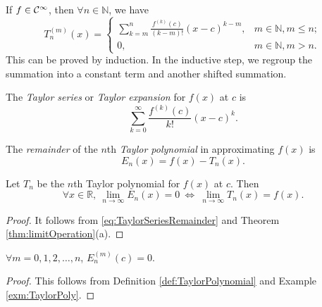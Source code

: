  \begin{exm}
   \label{exm:TaylorPoly}
  If $f\in {\cal C}^{\infty}$, then $\forall n\in\mathbb{N}$,
   we have
  \begin{equation*}
    T_n^{(m)}(x) = \left\{
    \begin{array}{ll}
      \sum_{k=m}^n\frac{f^{(k)}(c)}{(k-m)!}(x-c)^{k-m}, &
      m\in\mathbb{N}, m\le n;
      \\
      0, & m\in\mathbb{N}, m> n.
    \end{array}
    \right.
  \end{equation*}
This can be proved by induction.
In the inductive step, we regroup the summation
 into a constant term and another shifted summation.
\end{exm}

\begin{defn}
  \label{def:TaylorSeries}
The \emph{Taylor series} or \emph{Taylor expansion} 
   for $f(x)$ at $c$ is
 \begin{equation}
     \label{eq:TaylorSeries}
     \sum_{k=0}^{\infty}\frac{f^{(k)}(c)}{k!}(x-c)^k.
   \end{equation}
\end{defn}

\begin{defn}
The \emph{remainder} of the $n$th \emph{Taylor polynomial}
 in approximating $f(x)$ is
  \begin{equation}
    \label{eq:TaylorSeriesRemainder}
    E_n(x) = f(x) - T_n(x).
  \end{equation}
\end{defn}

\begin{thm}
  \label{thm:limitTaylorRemainder}
  Let $T_n$ be the $n$th Taylor polynomial for $f(x)$ at $c$. Then
  \begin{equation}
    \forall x\in \mathbb{R},\
    \lim_{n\rightarrow\infty} E_n(x) = 0
    \ \Leftrightarrow\
    \lim_{n\rightarrow\infty}T_n(x) = f(x).
  \end{equation}
\end{thm}
\begin{proof}
  It follows from \eqref{eq:TaylorSeriesRemainder}
  and Theorem \ref{thm:limitOperation}(a).
\end{proof}

\begin{lem}
  \label{lem:remainder}
  $\forall m=0,1,2,\ldots,n$, $E_n^{(m)}(c)=0$.
\end{lem}
\begin{proof}
  This follows from Definition \ref{def:TaylorPolynomial}
   and Example \ref{exm:TaylorPoly}.
\end{proof}

